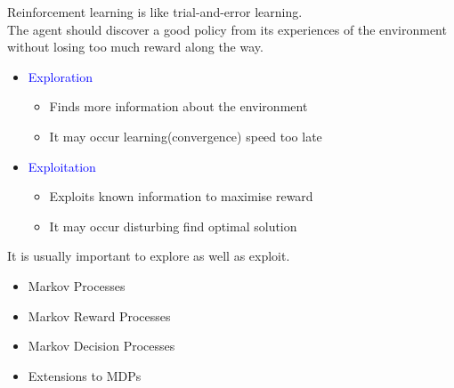 \documentclass[landscape]{article}
\def\tcb{\textcolor{blue}}
\begin{document}
\newpage
\newvgtitle{\tcb{Exploration and Exploitation}}
\LARGE
\vspace{-.5em}
Reinforcement learning is like trial-and-error learning.\\
The agent should discover a good policy from its experiences of the environment without losing too much reward along the way.
\vspace{0.5cm}
\begin{itemize}
    \item \huge \tcb{Exploration}
    \LARGE
    \begin{itemize}
        \item Finds more information about the environment
        \item It may occur learning(convergence) speed too late
    \end{itemize}
    \vspace{0.5cm}
    \item \huge \tcb{Exploitation}
    \LARGE
    \begin{itemize}
        \item Exploits known information to maximise reward
        \item It may occur disturbing find optimal solution
    \end{itemize}
\end{itemize}
\vspace{0.5cm}
It is usually important to explore as well as exploit.

\newpage
\newvgtitle{\tcb{Markov Processes}}
\LARGE
\vspace{-.5em}
\vspace{0.5cm}
\huge
\begin{itemize}
    \item {Markov Processes}
    \vspace{1cm}
    \item {Markov Reward Processes}
    \vspace{1cm}
    \item {Markov Decision Processes}
    \vspace{1cm}
    \item {Extensions to MDPs}
    \vspace{1cm}
\end{itemize}
\LARGE
\vspace{0.5cm}
\end{document}
